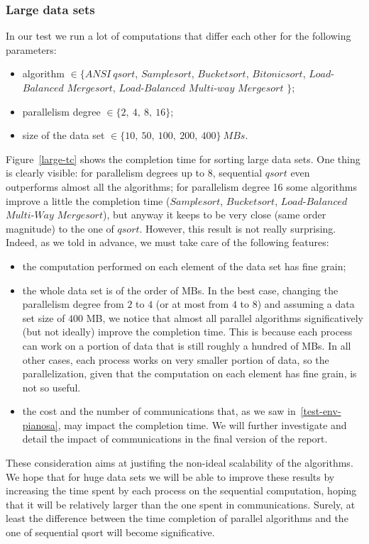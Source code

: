 \subsubsection*{Large data sets}
In our test we run a lot of computations that differ each other for the following parameters:
\begin{itemize}
\item algorithm $\in \lbrace ANSI\ qsort$, $Samplesort$, $Bucketsort$, $Bitonicsort$, $Load$-$Balanced$ $Mergesort$, $Load$-$Balanced$ $Multi$-$way$ $Mergesort$ $\rbrace$;
\item parallelism degree $\in \lbrace 2,\ 4,\ 8,\ 16 \rbrace$;
\item size of the data set $\in \lbrace 10,\ 50,\ 100,\ 200,\ 400 \rbrace \ MBs$.
\end{itemize} 
Figure~\ref{large-tc} shows the completion time for sorting large data sets. One thing is clearly visible: for parallelism degrees up to 8, sequential $qsort$ even outperforms almost all the algorithms; for parallelism degree 16 some algorithms improve a little the completion time ($Samplesort$, $Bucketsort$, $Load$-$Balanced$ $Multi$-$Way$ $Mergesort$), but anyway it keeps to be very close (same order magnitude) to the one of $qsort$. However, this result is not really surprising. Indeed, as we told in advance, we must take care of the following features:
\begin{itemize}
\item the computation performed on each element of the data set has fine grain;
\item the whole data set is of the order of MBs. In the best case, changing the parallelism degree from $2$ to $4$ (or at most from $4$ to $8$) and assuming a data set size of $400$ MB, we notice that almost all parallel algorithms significatively (but not ideally) improve the completion time. This is because each process can work on a portion of data that is still roughly a hundred of MBs. In all other cases, each process works on very smaller portion of data, so the parallelization, given that the computation on each element has fine grain, is not so useful. 
\item the cost and the number of communications that, as we saw in~\ref{test-env-pianosa}, may impact the completion time. We will further investigate and detail the impact of communications in the final version of the report.
\end{itemize}
These consideration aims at justifing the non-ideal scalability of the algorithms. We hope that for huge data sets we will be able to improve these results by increasing the time spent by each process on the sequential computation, hoping that it will be relatively larger than the one spent in communications. Surely, at least the difference between the time completion of parallel algorithms and the one of sequential qsort will become significative.
